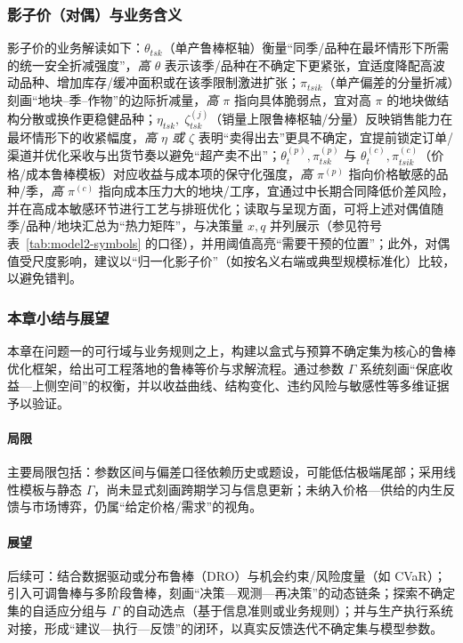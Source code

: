 \subsubsection{影子价（对偶）与业务含义}
{\setlength{\emergencystretch}{2em}%
影子价的业务解读如下：$\theta_{tsk}$（单产鲁棒枢轴）衡量“同季/品种在最坏情形下所需的统一安全折减强度”，\emph{高 $\theta$} 表示该季/品种在不确定下更紧张，宜适度降配高波动品种、增加库存/缓冲面积或在该季限制激进扩张；$\pi_{tsik}$（单产偏差的分量折减）刻画“地块–季–作物”的边际折减量，\emph{高 $\pi$} 指向具体脆弱点，宜对高 $\pi$ 的地块做结构分散或换作更稳健品种；$\eta_{tsk},\;\zeta_{tsk}^{(j)}$（销量上限鲁棒枢轴/分量）反映销售能力在最坏情形下的收紧幅度，\emph{高 $\eta$ 或 $\zeta$} 表明“卖得出去”更具不确定，宜提前锁定订单/渠道并优化采收与出货节奏以避免“超产卖不出”；$\theta^{(p)}_t,\pi^{(p)}_{tsk}$ 与 $\theta^{(c)}_t,\pi^{(c)}_{tsik}$（价格/成本鲁棒模板）对应收益与成本项的保守化强度，\emph{高 $\pi^{(p)}$} 指向价格敏感的品种/季，\emph{高 $\pi^{(c)}$} 指向成本压力大的地块/工序，宜通过中长期合同降低价差风险，并在高成本敏感环节进行工艺与排班优化；读取与呈现方面，可将上述对偶值随季/品种/地块汇总为“热力矩阵”，与决策量 $x,q$ 并列展示（参见符号表~\ref{tab:model2-symbols} 的口径），并用阈值高亮“需要干预的位置”；此外，对偶值受尺度影响，建议以“归一化影子价”（如按名义右端或典型规模标准化）比较，以避免错判。}

\subsubsection{本章小结与展望}
 本章在问题一的可行域与业务规则之上，构建以盒式与预算不确定集为核心的鲁棒优化框架，给出可工程落地的鲁棒等价与求解流程。通过参数 $\Gamma$ 系统刻画“保底收益—上侧空间”的权衡，并以收益曲线、结构变化、违约风险与敏感性等多维证据予以验证。

 \paragraph{局限}
 主要局限包括：参数区间与偏差口径依赖历史或题设，可能低估极端尾部；采用线性模板与静态 $\Gamma$，尚未显式刻画跨期学习与信息更新；未纳入价格—供给的内生反馈与市场博弈，仍属“给定价格/需求”的视角。

 \paragraph{展望}
 后续可：结合数据驱动或分布鲁棒（DRO）与机会约束/风险度量（如 CVaR）；引入可调鲁棒与多阶段鲁棒，刻画“决策—观测—再决策”的动态链条；探索不确定集的自适应分组与 $\Gamma$ 的自动选点（基于信息准则或业务规则）；并与生产执行系统对接，形成“建议—执行—反馈”的闭环，以真实反馈迭代不确定集与模型参数。